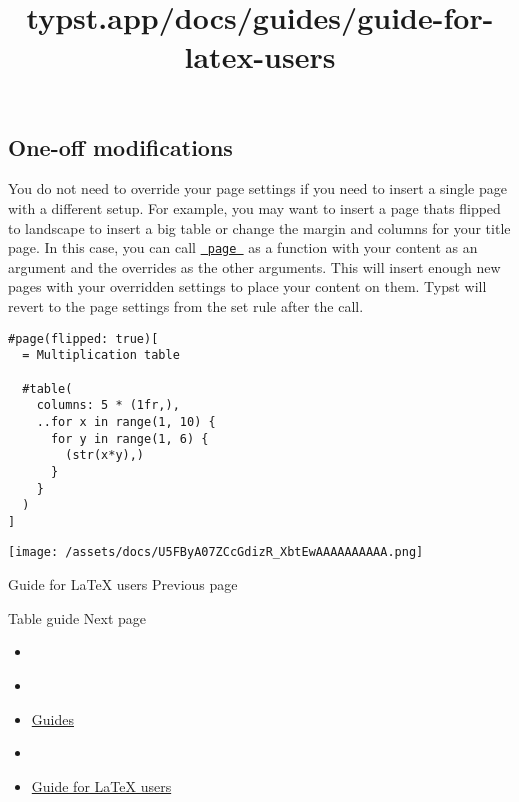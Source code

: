 \subsection{One-off modifications}\label{one-off-modifications}

You do not need to override your page settings if you need to insert a
single page with a different setup. For example, you may want to insert
a page that\textquotesingle s flipped to landscape to insert a big table
or change the margin and columns for your title page. In this case, you
can call \href{/docs/reference/layout/page/}{\texttt{\ page\ }} as a
function with your content as an argument and the overrides as the other
arguments. This will insert enough new pages with your overridden
settings to place your content on them. Typst will revert to the page
settings from the set rule after the call.

\begin{verbatim}
#page(flipped: true)[
  = Multiplication table

  #table(
    columns: 5 * (1fr,),
    ..for x in range(1, 10) {
      for y in range(1, 6) {
        (str(x*y),)
      }
    }
  )
]
\end{verbatim}

\texttt{[image: /assets/docs/U5FByA07ZCcGdizR\_XbtEwAAAAAAAAAA.png]}

\href{/docs/guides/guide-for-latex-users/}{\pandocbounded{}}

{ Guide for LaTeX users } { Previous page }

\href{/docs/guides/table-guide/}{\pandocbounded{}}

{ Table guide } { Next page }


\title{typst.app/docs/guides/guide-for-latex-users}

\begin{itemize}
\tightlist
\item
  \href{/docs}{}
\item
  
\item
  \href{/docs/guides/}{Guides}
\item
  
\item
  \href{/docs/guides/guide-for-latex-users/}{Guide for LaTeX users}
\end{itemize}

